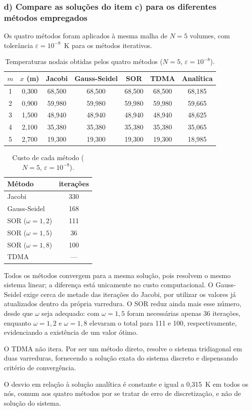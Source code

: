 \subsubsection*{d) Compare as soluções do item c) para os diferentes métodos
empregados}

Os quatro métodos foram aplicados à mesma malha de $N=5$ volumes, com
tolerância $\varepsilon=10^{-8}$~K para os métodos iterativos.

\begin{table}[H]
\centering
\caption{Temperaturas nodais obtidas pelos quatro métodos
($N=5$, $\varepsilon=10^{-8}$).}
\begin{tabular}{ccccccc}
\hline
$m$ & $x$ (m) & Jacobi & Gauss-Seidel & SOR & TDMA & Analítica\\
\hline
1 & 0,300 & 68,500 & 68,500 & 68,500 & 68,500 & 68,185\\
2 & 0,900 & 59,980 & 59,980 & 59,980 & 59,980 & 59,665\\
3 & 1,500 & 48,940 & 48,940 & 48,940 & 48,940 & 48,625\\
4 & 2,100 & 35,380 & 35,380 & 35,380 & 35,380 & 35,065\\
5 & 2,700 & 19,300 & 19,300 & 19,300 & 19,300 & 18,985\\
\hline
\end{tabular}
\end{table}

\begin{table}[H]
\centering
\caption{Custo de cada método ($N=5$, $\varepsilon=10^{-8}$).}
\begin{tabular}{lc}
\hline
Método & iterações\\
\hline
Jacobi               & 330\\
Gauss-Seidel         & 168\\
SOR ($\omega=1{,}2$) & 111\\
SOR ($\omega=1{,}5$) &  36\\
SOR ($\omega=1{,}8$) & 100\\
TDMA                 & ---\\
\hline
\end{tabular}
\end{table}

Todos os métodos convergem para a mesma solução, pois resolvem o mesmo sistema
linear; a diferença está unicamente no custo computacional. O Gauss-Seidel
exige cerca de metade das iterações do Jacobi, por utilizar os valores já
atualizados dentro da própria varredura. O SOR reduz ainda mais esse número,
desde que $\omega$ seja adequado: com $\omega=1{,}5$ foram necessárias apenas
36 iterações, enquanto $\omega=1{,}2$ e $\omega=1{,}8$ elevaram o total para
111 e 100, respectivamente, evidenciando a existência de um valor ótimo.

O TDMA não itera. Por ser um método direto, resolve o sistema tridiagonal em
duas varreduras, fornecendo a solução exata do sistema discreto e dispensando
critério de convergência.

O desvio em relação à solução analítica é constante e igual a
0,315~K em todos os nós, comum aos quatro métodos por se tratar de
erro de discretização, e não de solução do sistema.